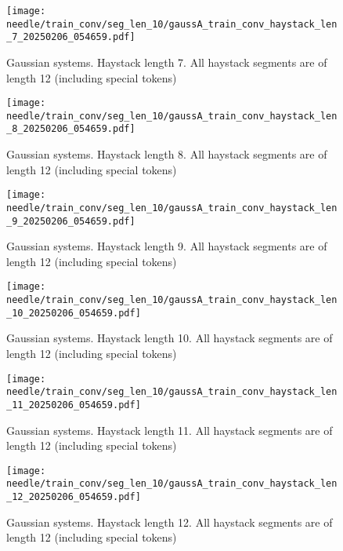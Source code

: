 \begin{figure}
    \centering
    \texttt{[image: needle/train\_conv/seg\_len\_10/gaussA\_train\_conv\_haystack\_len\_7\_20250206\_054659.pdf]}
    \caption{Gaussian systems. Haystack length 7. All haystack segments are of length 12 (including special tokens)}
    \label{fig:gauss_needle_train_conv_haystack_len_7_all_haystack_len_12}

\end{figure}

\begin{figure}
    \centering
    \texttt{[image: needle/train\_conv/seg\_len\_10/gaussA\_train\_conv\_haystack\_len\_8\_20250206\_054659.pdf]}
    \caption{Gaussian systems. Haystack length 8. All haystack segments are of length 12 (including special tokens)}
    \label{fig:gauss_needle_train_conv_haystack_len_8_all_haystack_len_12}
\end{figure}

\begin{figure}
    \centering
    \texttt{[image: needle/train\_conv/seg\_len\_10/gaussA\_train\_conv\_haystack\_len\_9\_20250206\_054659.pdf]}
    \caption{Gaussian systems. Haystack length 9. All haystack segments are of length 12 (including special tokens)}
    \label{fig:gauss_needle_train_conv_haystack_len_9_all_haystack_len_12}
\end{figure}

\begin{figure}
    \centering
    \texttt{[image: needle/train\_conv/seg\_len\_10/gaussA\_train\_conv\_haystack\_len\_10\_20250206\_054659.pdf]}
    \caption{Gaussian systems. Haystack length 10. All haystack segments are of length 12 (including special tokens)}
    \label{fig:gauss_needle_train_conv_haystack_len_10_all_haystack_len_12}

\end{figure}

\begin{figure}
    \centering
    \texttt{[image: needle/train\_conv/seg\_len\_10/gaussA\_train\_conv\_haystack\_len\_11\_20250206\_054659.pdf]}
    \caption{Gaussian systems. Haystack length 11. All haystack segments are of length 12 (including special tokens)}
    \label{fig:gauss_needle_train_conv_haystack_len_11_all_haystack_len_12}
\end{figure}

\begin{figure}
    \centering
    \texttt{[image: needle/train\_conv/seg\_len\_10/gaussA\_train\_conv\_haystack\_len\_12\_20250206\_054659.pdf]}
    \caption{Gaussian systems. Haystack length 12. All haystack segments are of length 12 (including special tokens)}
    \label{fig:gauss_needle_train_conv_haystack_len_12_all_haystack_len_12}
\end{figure}

